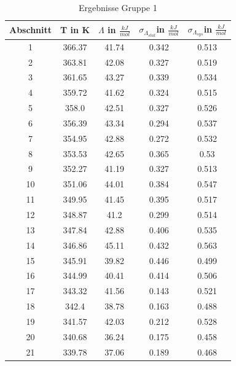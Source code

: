 \documentclass[12pt,a4paper]{article}
\begin{document}
\begin{table}[H]\centering
\caption{Ergebnisse Gruppe 1}

\begin{tabular}{c|c|c|c|c}
Abschnitt&T in K&$\Lambda$ in $\frac{kJ}{mol}$&$\sigma_{\Lambda_{stat}}$in $\frac{kJ}{mol}$&$\sigma_{\Lambda_{sys}}$in $\frac{kJ}{mol}$\\
\hline
1&366.37&41.74&0.342&0.513\\
2&363.81&42.08&0.327&0.519\\
3&361.65&43.27&0.339&0.534\\
4&359.72&41.62&0.324&0.515\\
5&358.0&42.51&0.327&0.526\\
6&356.39&43.34&0.294&0.537\\
7&354.95&42.88&0.272&0.532\\
8&353.53&42.65&0.365&0.53\\
9&352.27&41.19&0.327&0.513\\
10&351.06&44.01&0.384&0.547\\
11&349.95&41.45&0.395&0.517\\
12&348.87&41.2&0.299&0.514\\
13&347.84&42.88&0.406&0.535\\
14&346.86&45.11&0.432&0.563\\
15&345.91&39.82&0.446&0.499\\
16&344.99&40.41&0.414&0.506\\
17&343.32&41.56&0.143&0.521\\
18&342.4&38.78&0.163&0.488\\
19&341.57&42.03&0.212&0.528\\
20&340.68&36.24&0.175&0.458\\
21&339.78&37.06&0.189&0.468\\
\end{tabular}
\end{table}
\end{document}
